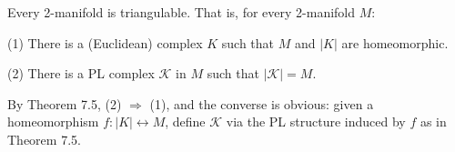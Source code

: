 Every 2-manifold is triangulable. That is, for every 2-manifold $M$:

(1) There is a (Euclidean) complex $K$ such that $M$ and $|K|$ are homeomorphic.

(2) There is a PL complex $\mathcal{K}$ in $M$ such that $|\mathcal{K}| = M$.

By Theorem 7.5, (2) $\Rightarrow$ (1), and the converse is obvious: given a homeomorphism $f: |K| \leftrightarrow M$, define $\mathcal{K}$ via the PL structure induced by $f$ as in Theorem 7.5.
